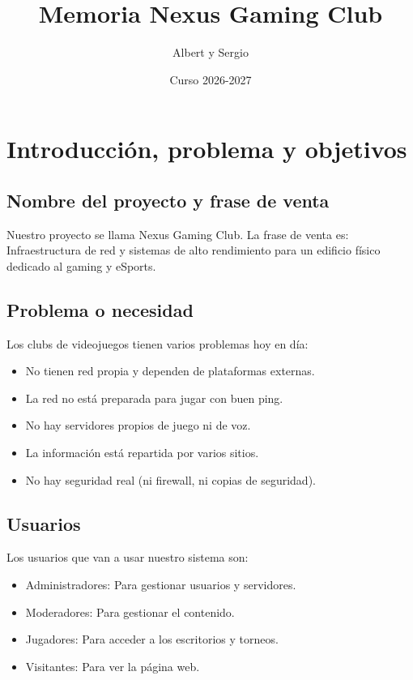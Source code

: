 \documentclass{article}
\title{Memoria Nexus Gaming Club}
\author{Albert y Sergio}
\date{Curso 2026-2027}
\begin{document}
\maketitle

\section{Introducción, problema y objetivos}

\subsection{Nombre del proyecto y frase de venta}
Nuestro proyecto se llama Nexus Gaming Club. 
La frase de venta es: Infraestructura de red y sistemas de alto rendimiento para un edificio físico dedicado al gaming y eSports.

\subsection{Problema o necesidad}
Los clubs de videojuegos tienen varios problemas hoy en día:
\begin{itemize}
    \item No tienen red propia y dependen de plataformas externas.
    \item La red no está preparada para jugar con buen ping.
    \item No hay servidores propios de juego ni de voz.
    \item La información está repartida por varios sitios.
    \item No hay seguridad real (ni firewall, ni copias de seguridad).
\end{itemize}

\subsection{Usuarios}
Los usuarios que van a usar nuestro sistema son:
\begin{itemize}
    \item Administradores: Para gestionar usuarios y servidores.
    \item Moderadores: Para gestionar el contenido.
    \item Jugadores: Para acceder a los escritorios y torneos.
        \item Visitantes: Para ver la página web.
\end{itemize}
\end{document}
